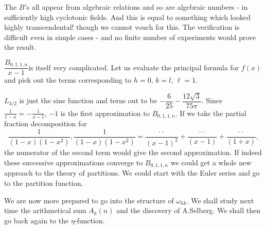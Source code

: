 The $B'$s all appear from algebraic relations and so are algebraic
numbers - in sufficiently high cyclotonic fields. And this is equal to
something which looked highly transcendental! though we cannot vouch
for this. The verification is difficult even in simple cases - and no
finite number of experiments would prove the result.

$\dfrac{B_{0, 1, 1, n}}{x-1}$\pageoriginale is itself very complicated. Let us
evaluate the principal formula for $f(x)$ and pick out the terms
corresponding to $h=0$, $k=l$, $\ell =1$.

$L_{3/2}$ is just the sine function and terns out to be
$-\dfrac{6}{25}- \dfrac{12\sqrt{3}}{75 \pi}$. Since $\frac{1}{1-x} =-
\frac{1}{x-1}$, $-1$ is the first approximation to $B_{0, 1, 1,
  n}$. If we take the partial fraction decomposition for 
$$
\frac{1}{(1-x)(1-x^2)}, \frac{1}{(1-x)(1-x^2)}= \frac{\cdot
   \cdot}{(x-1)^2}+\frac{\cdot \cdot}{(x-1)}+\frac{\cdot\cdot}{(1+x)},
$$
the numerator of the second term would give the second
approximation. If indeed these successive approximations converge to
$B_{0, 1,1,n}$ we could get a whole new approach to the theory of
partitions. We could start with the Euler series and go to the
partition function. 

We are now more prepared to go into the structure of $\omega_{hk}$. We
shall study next time the arithmetical sum $A_k(n)$ and the discovery
of A.Selberg. We shall then go back again to the $\eta$-function. 

